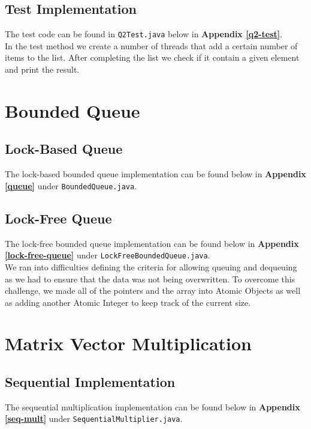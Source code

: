 \documentclass{article}%
\begin{document}
    \subsection{Test Implementation}
        The test code can be found in \texttt{Q2Test.java} below in \textbf{Appendix \ref{q2-test}}. \\
        
        In the test method we create a number of threads that add a certain number of items to the list. After completing the list we check if it contain a given element and print the result.

        
\section{Bounded Queue} 
    \subsection{Lock-Based Queue}
    The lock-based bounded queue implementation can be found below in \textbf{Appendix \ref{queue}} under \texttt{BoundedQueue.java}.
    
    \subsection{Lock-Free Queue}
    The lock-free bounded queue implementation can be found below in \textbf{Appendix \ref{lock-free-queue}} under \texttt{LockFreeBoundedQueue.java}.\\
    
    We ran into difficulties defining the criteria for allowing queuing and dequeuing as we had to ensure that the data was not being overwritten. To overcome this challenge, we made all of the pointers and the array into Atomic Objects as well as adding another Atomic Integer to keep track of the current size. 
    


\section{Matrix Vector Multiplication}
    \subsection{Sequential Implementation}
        The sequential multiplication implementation can be found below in \textbf{Appendix \ref{seq-mult}} under \texttt{SequentialMultiplier.java}.\\
        
\end{document}
